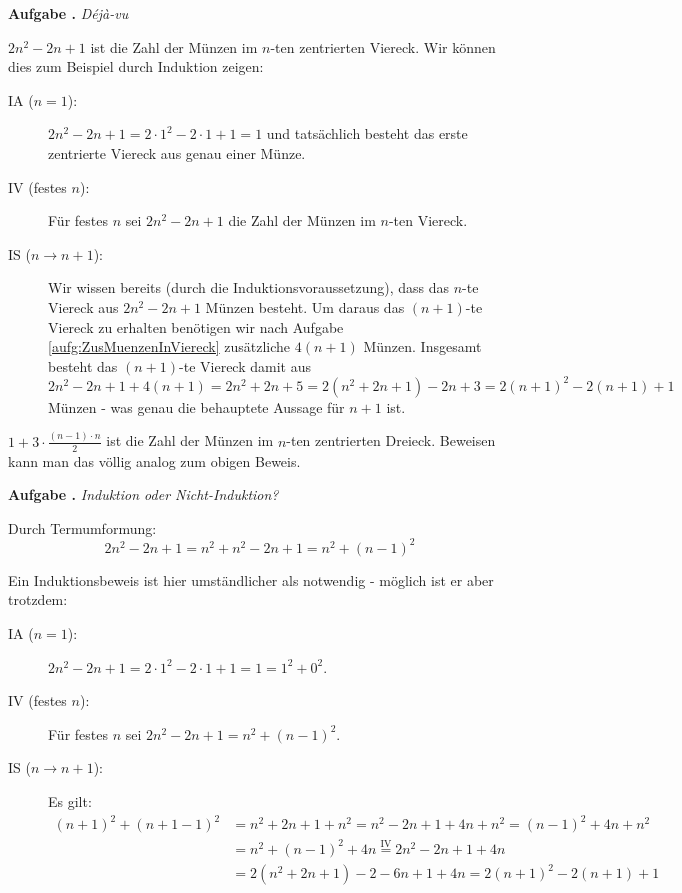 \documentclass[a4paper,ngerman,12pt]{scrartcl}
\theoremstyle{definition}
\theoremstyle{plain}
\theoremstyle{remark}
\newlength{\aufgabenskip}
\newcounter{aufgabennummer}
\newenvironment{aufgabe}[1]{
	\addtocounter{aufgabennummer}{1}
	\textbf{Aufgabe \theaufgabennummer.} \emph{#1} \par
}{\vspace{\aufgabenskip}}
\begin{document}
\begin{aufgabe}{Déjà-vu}\label{aufg:dejavu}
	$2n^2-2n+1$ ist die Zahl der Münzen im $n$-ten zentrierten Viereck. Wir können dies zum Beispiel durch Induktion zeigen:
	
	\begin{description}
		\item[IA ($n=1$):] $2n^2-2n+1  = 2\cdot 1^2 -2 \cdot 1 + 1= 1$ und tatsächlich besteht das erste zentrierte Viereck aus genau einer Münze.
		\item[IV (festes $n$):] Für festes $n$ sei $2n^2-2n+1$ die Zahl der Münzen im $n$-ten Viereck.
		\item[IS ($n \to n+1$):] Wir wissen bereits (durch die Induktionsvoraussetzung), dass das $n$-te Viereck aus $2n^2 -2n +1$ Münzen besteht. Um daraus das $(n+1)$-te Viereck zu erhalten benötigen wir nach Aufgabe \ref{aufg:ZusMuenzenInViereck} zusätzliche $4(n+1)$ Münzen. Insgesamt besteht das $(n+1)$-te Viereck damit aus
		\[2n^2-2n+1 + 4(n+1) = 2n^2 +2n +5 = 2(n^2 + 2n +1) -2n+3 = 2(n+1)^2 - 2(n+1) +1\]
		Münzen - was genau die behauptete Aussage für $n+1$ ist.
	\end{description}
	
	$1 + 3\cdot\frac{(n-1)\cdot n}{2}$ ist die Zahl der Münzen im $n$-ten zentrierten Dreieck. Beweisen kann man das völlig analog zum obigen Beweis.
\end{aufgabe}

\begin{aufgabe}{Induktion oder Nicht-Induktion?}
	Durch Termumformung:
		\[2n^2-2n+1 = n^2 + n^2-2n+1 = n^2 + (n-1)^2\]
		
	Ein Induktionsbeweis ist hier umständlicher als notwendig - möglich ist er aber trotzdem:
	\begin{description}
		\item[IA ($n=1$):] $2n^2-2n+1  = 2\cdot 1^2 -2 \cdot 1 + 1= 1 = 1^2 + 0^2$.
		\item[IV (festes $n$):] Für festes $n$ sei $2n^2-2n+1 = n^2 + (n-1)^2$.
		\item[IS ($n \to n+1$):] Es gilt:
			\begin{align*}
				(n+1)^2 + (n+1-1)^2 &= n^2 + 2n + 1 + n^2 = n^2-2n +1 + 4n + n^2 = (n-1)^2 + 4n + n^2 \\ 
				&=n^2 + (n-1)^2 + 4n \overset{\text{IV}}{=} 2n^2 - 2n + 1 + 4n \\
				&= 2(n^2 + 2n + 1) -2 -6n + 1 + 4n = 2(n+1)^2 - 2(n+1) + 1
			\end{align*}
	\end{description}	
\end{aufgabe}
\end{document}
